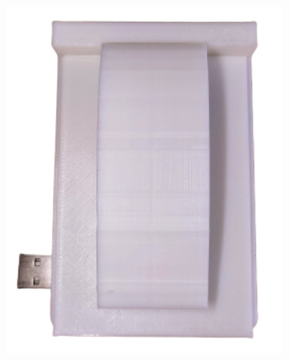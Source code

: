 \begin{figure}[H]
  \centering
	\begin{subfigure}[b]{0.45\textwidth}
    \centering
    \includegraphics[width=\textwidth]{img/Chap5/Prototype_View_above.png}
  \end{subfigure}
  \hfill
	\begin{subfigure}[b]{0.46\textwidth}
    \centering

\end{subfigure}
\end{figure}
